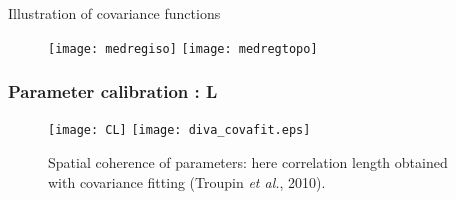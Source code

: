 


\begin{frame}{Illustration of covariance functions}
\vspace{-0.5cm}
\begin{figure}[H]
\begin{center}
\texttt{[image: medregiso]}
\vspace{0cm}
\texttt{[image: medregtopo]}
\end{center}
\end{figure}

\end{frame}


\begin{frame}
\frametitle{Parameter calibration : L}

\begin{figure}[H]
\centerline{
\texttt{[image: CL]} \texttt{[image: diva\_covafit.eps]}
}
\caption {Spatial coherence of parameters: here correlation length obtained with covariance fitting  
(Troupin {\it et al.}, 2010).}
\end{figure}

\end{frame}


